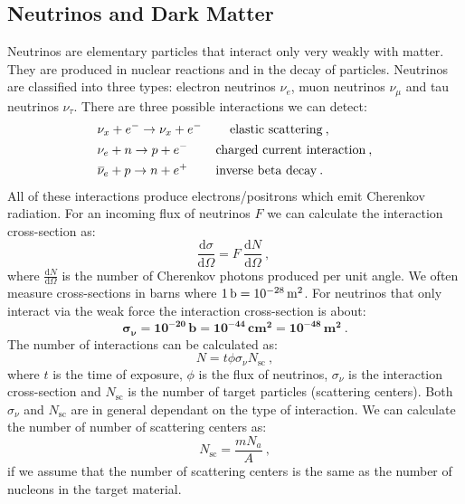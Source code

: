 \documentclass[10pt, titlepage, a4paper]{article}
\newcommand{\dd}{\mathrm{d}}
\newcommand\thickbar[1]{\accentset{\rule{.5em}{.03em}}{#1}}
\renewcommand{\bar}{\thickbar}
\numberwithin{equation}{section}
\begin{document}
\subsection{Neutrinos and Dark Matter}
Neutrinos are elementary particles that interact only very weakly with matter. They are produced in nuclear reactions and in the decay of
particles. Neutrinos are classified into three types: electron neutrinos $\nu_e$, muon neutrinos $\nu_\mu$ and tau neutrinos $\nu_\tau$.
There are three possible interactions we can detect:
%
\begin{align*}
    & \nu_x + e^- \rightarrow \nu_x + e^-\> \qquad \text{elastic scattering}\>, \\
    & \nu_e + n \rightarrow p + e^-\> \qquad \text{charged current interaction}\>, \\
    & \bar{\nu}_e + p \rightarrow n + e^+\> \qquad \text{inverse beta decay}\>.
\end{align*}
%
All of these interactions produce electrons/positrons which emit Cherenkov radiation. For an incoming flux of neutrinos $F$ we can calculate the interaction 
cross-section as:
%
\begin{equation}
    \frac{\dd\sigma}{\dd\Omega} = F\>\frac{\dd N}{\dd\Omega}\>,\
    \label{eq:cross-section}
\end{equation}
%
where $\frac{\dd N}{\dd\Omega}$ is the number of Cherenkov photons produced per unit angle. We often measure cross-sections in barns where $1\,\rm{b} = 10^{-28}\,\rm{m}^2$.
For neutrinos that only interact via the weak force the interaction cross-section is about:
%
\begin{equation}
    \bm{\sigma_\nu} = \bm{10^{-20}}\,\textbf{b} = \bm{10^{-44}}\,\textbf{cm}\bm{^2} = \bm{10^{-48}}\,\textbf{m}\bm{^2}\>.
\end{equation}
%
The number of interactions can be calculated as:
%
\begin{equation}
    N = t\phi \sigma_\nu N_\text{sc}\>,
    \label{eq:nu-interactions}
\end{equation}
%
where $t$ is the time of exposure, $\phi$ is the flux of neutrinos, $\sigma_\nu$ is the interaction cross-section and $N_\text{sc}$ is the number of target particles (scattering 
centers). Both $\sigma_\nu$ and $N_\text{sc}$ are in general dependant on the type of interaction. We can calculate the number of number of scattering centers as:
%
\begin{equation}
    N_\text{sc} = \frac{m N_a}{A}\>,
\end{equation}
%
if we assume that the number of scattering centers is the same as the number of nucleons in the target material. 
\end{document}
